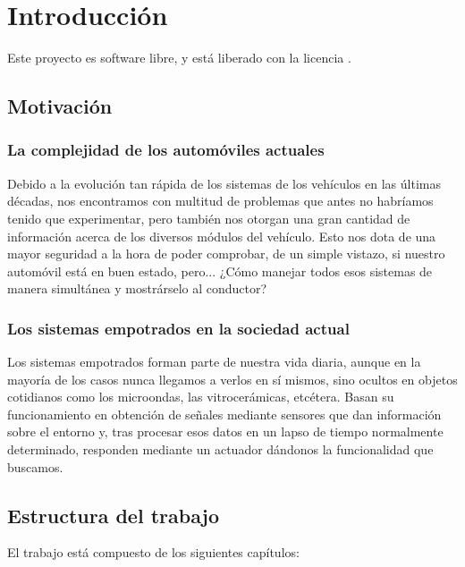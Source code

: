 \chapter{Introducción}

Este proyecto es software libre, y está liberado con la licencia \cite{gplv3}.

\section{Motivación}

\subsection{La complejidad de los automóviles actuales}

Debido a la evolución tan rápida de los sistemas de los vehículos en las últimas décadas, nos encontramos con multitud de problemas que antes no habríamos tenido que experimentar, pero también nos otorgan una gran cantidad de información acerca de los diversos módulos del vehículo. 
Esto nos dota de una mayor seguridad a la hora de poder comprobar, de un simple vistazo, si nuestro automóvil está en buen estado, pero... ¿Cómo manejar todos esos sistemas de manera simultánea y mostrárselo al conductor? 



\subsection{Los sistemas empotrados en la sociedad actual}

Los sistemas empotrados forman parte de nuestra vida diaria, aunque en la mayoría de los casos nunca llegamos a verlos en sí mismos, sino ocultos en objetos cotidianos como los microondas, las vitrocerámicas, etcétera. Basan su funcionamiento en obtención de señales mediante sensores que dan información sobre el entorno y, tras procesar esos datos en un lapso de tiempo normalmente determinado, responden mediante un actuador dándonos la funcionalidad que buscamos. 


\newpage
\section{Estructura del trabajo}

El trabajo está compuesto de los siguientes capítulos: 

